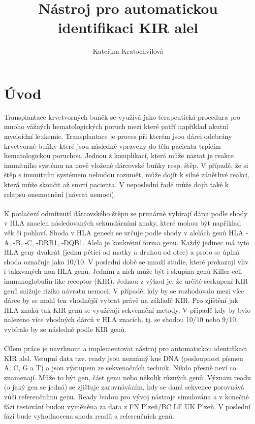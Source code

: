 \documentclass[czech,DP]{thesiskiv}
\author{Kateřina Kratochvílová}
\title{Nástroj pro automatickou identifikaci KIR alel}
\numberwithin{equation}{section}
\begin{document}
%
\maketitle
\tableofcontents

\chapter{Úvod}
Transplantace krvetvorných buněk se využívá jako terapeutická procedura pro mnoho vážných hematologických poruch mezi které patří například akutní myeloidní leukemie. Transplantace je proces při kterém jsou dárci odebrány krvetvorné buňky které jsou následně vpraveny do těla pacienta trpícím hematologickou poruchou. Jednou z komplikací, která může nastat je reakce imunitního systému na nově vložené dárcovské buňky resp. štěp. V případě, že si štěp s imunitním systémem nebudou rozumět, může dojít k silné zánětlivé reakci, která může skončit až smrtí pacienta. V neposlední řadě může dojít také k relapsu onemocnění (návrat nemoci). 
\\
\\
K potlačení odmítnutí dárcovského štěpu se primárně vybírají dárci podle shody v HLA znacích následovaných sekundárními znaky, které mohou být například věk či pohlaví. Shoda v HLA genech se určuje podle shody v alelách genů HLA -A, -B, -C, -DRB1, -DQB1. Alela je konkrétní forma genu. Každý jedinec má tyto HLA geny dvakrát (jednu pětici od matky a druhou od otce) a proto se úplná shoda označuje jako 10/10. V poslední době se množí studie, které prokazují vliv i takzvaných non-HLA genů. Jedním z nich může být i skupina genů Killer-cell immunoglobulin-like receptor (KIR). Jednou z výhod je, že určité seskupení KIR genů snižuje riziko návratu nemoci. V případě, kdy by se rozhodovalo mezi více dárce by se mohl ten vhodnější vybrat právě na základě KIR. Pro zjištění jak HLA znaků tak KIR genů se využívají sekvenační metody. V případě kdy by bylo nalezeno více vhodných dárců v HLA znacích, tj. se shodou 10/10 nebo 9/10, vybíralo by se následně podle KIR genů. \cite{KIR_transplantace_jindra} \cite{Frycova_bakalarka}
\\
\\
Cílem práce je navrhnout a implementovat nástroj pro automatickou identifikaci KIR alel. Vstupní data tzv. ready jsou neznámý kus DNA (posloupnost písmen A, C, G a T) a jsou výstupem ze sekvenačních technik. Nikdo přesně neví co znamenají. Může to být gen, část genu nebo několik různých genů. Význam readu (o jaký gen se jedná) se zjišťuje zarovnáváním, kdy se daná sekvence porovnává vůči referenčnímu genu. Ready budou pro vývoj nástroje simulována a v konečné fázi testování budou vyměněna za data z FN Plzeň/BC LF UK Plzeň. V poslední fázi bude vyhodnocena shoda readů a referenčních genů.
\end{document}

